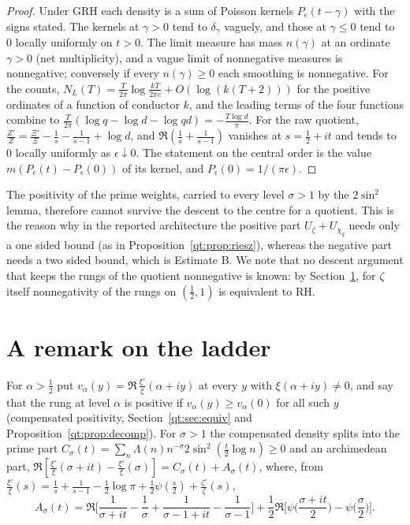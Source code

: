 \begin{proof}
Under GRH each density is a sum of Poisson kernels $P_\epsilon(t-\gamma)$ with the signs stated. The kernels at $\gamma>0$ tend to $\delta_\gamma$ vaguely, and those at $\gamma\le0$ tend to $0$ locally uniformly on $t>0$. The limit measure has mass $n(\gamma)$ at an ordinate $\gamma>0$ (net multiplicity), and a vague limit of nonnegative measures is nonnegative; conversely if every $n(\gamma)\ge0$ each smoothing is nonnegative. For the counts, $N_L(T)=\frac T{2\pi}\log\frac{kT}{2\pi e}+O(\log(k(T+2)))$ for the positive ordinates of a function of conductor $k$, and the leading terms of the four functions combine to $\frac T{2\pi}(\log q-\log d-\log qd)=-\frac{T\log d}\pi$. For the raw quotient, $\frac{Z'}Z=\frac{\Xi'}\Xi-\frac1s-\frac1{s-1}+\log d$, and $\Re(\frac1s+\frac1{s-1})$ vanishes at $s=\frac12+it$ and tends to $0$ locally uniformly as $\epsilon\downarrow0$. The statement on the central order is the value $m(P_\epsilon(t)-P_\epsilon(0))$ of its kernel, and $P_\epsilon(0)=1/(\pi\epsilon)$.
\end{proof}

The positivity of the prime weights, carried to every level $\sigma>1$ by the $2\sin^2$ lemma, therefore cannot survive the descent to the centre for a quotient. This is the reason why in the reported architecture the positive part $U_\zeta+U_{\chi_q}$ needs only a one sided bound (as in Proposition~\ref{qt:prop:riesz}), whereas the negative part needs a two sided bound, which is Estimate B. We note that no descent argument that keeps the rungs of the quotient nonnegative is known: by Section~\ref{mq:sec:ladder}, for $\zeta$ itself nonnegativity of the rungs on $(\frac12,1)$ is equivalent to RH.

\section{A remark on the ladder}\label{mq:sec:ladder}

For $\alpha>\frac12$ put $v_\alpha(y)=\Re\,\frac{\xi'}\xi(\alpha+iy)$ at every $y$ with $\xi(\alpha+iy)\ne0$, and say that the rung at level $\alpha$ is positive if $v_\alpha(y)\ge v_\alpha(0)$ for all such $y$ (compensated positivity, Section~\ref{qt:sec:equiv} and Proposition~\ref{qt:prop:decomp}). For $\sigma>1$ the compensated density splits into the prime part $C_\sigma(t)=\sum_n\Lambda(n)n^{-\sigma}2\sin^2(\frac t2\log n)\ge0$ and an archimedean part, $\Re[\frac{\xi'}\xi(\sigma+it)-\frac{\xi'}\xi(\sigma)]=C_\sigma(t)+A_\sigma(t)$, where, from $\frac{\xi'}\xi(s)=\frac1s+\frac1{s-1}-\frac12\log\pi+\frac12\psi(\frac s2)+\frac{\zeta'}\zeta(s)$,
\[
A_\sigma(t)=\Re\Big[\frac1{\sigma+it}-\frac1\sigma+\frac1{\sigma-1+it}-\frac1{\sigma-1}\Big]+\frac12\Re\Big[\psi\Big(\frac{\sigma+it}2\Big)-\psi\Big(\frac\sigma2\Big)\Big].
\]

